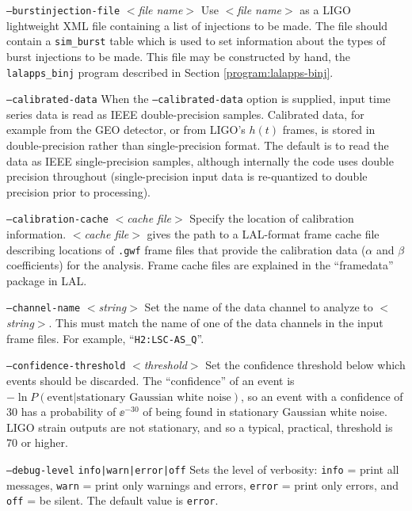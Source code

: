 \documentclass{article}
\newcommand{\option}[1]{\texttt{#1}}
\newcommand{\parm}[1]{$<$\textit{#1}$>$}
\newenvironment{entry}%
  {\begin{list}{}{\renewcommand{\makelabel}[1]%
    {\parbox[b]{\labelwidth}{\makebox[0pt][l]{\textbf{##1}}\\}}%
    \setlength{\labelwidth}{1em}%
    \setlength{\labelsep}{1em}%
    \setlength{\leftmargin}{2em}%
    \setlength{\topsep}{\medskipamount}%
    \setlength{\itemsep}{\medskipamount}%
    \setlength{\parsep}{\medskipamount}%
    \setlength{\listparindent}{0pt}}}
  {\end{list}}
\begin{document}
\begin{entry}
\begin{entry}
\item[\option{--burstinjection-file} \parm{file name}]
Use \parm{file name} as a LIGO lightweight XML file containing a list of
injections to be made.   The file should contain a \verb+sim_burst+ table
which is used to set information about the types of burst injections to be
made.  This file may be constructed by hand, the \verb+lalapps_binj+
program described in Section \ref{program:lalapps-binj}.

\item[\option{--calibrated-data}]
When the \option{--calibrated-data} option is supplied, input time series
data is read as IEEE double-precision samples.  Calibrated data, for
example from the GEO detector, or from LIGO's \(h(t)\) frames, is stored in
double-precision rather than single-precision format.  The default is to
read the data as IEEE single-precision samples, although internally the
code uses double precision throughout (single-precision input data is
re-quantized to double precision prior to processing).

\item[\option{--calibration-cache} \parm{cache file}]
Specify the location of calibration information.  \parm{cache file} gives
the path to a LAL-format frame cache file describing locations of
\texttt{.gwf} frame files that provide the calibration data ($\alpha$ and
$\beta$ coefficients) for the analysis.  Frame cache files are explained in
the ``framedata'' package in LAL.

\item[\option{--channel-name} \parm{string}]
Set the name of the data channel to analyze to \parm{string}.  This must
match the name of one of the data channels in the input frame files.  For
example, ``\verb|H2:LSC-AS_Q|''.

\item[\option{--confidence-threshold} \parm{threshold}]
Set the confidence threshold below which events should be discarded.  The
``confidence'' of an event is \(-\ln P(\text{event} | \text{stationary
Gaussian white noise})\), so an event with a confidence of 30 has a
probability of \(\ee^{-30}\) of being found in stationary Gaussian white
noise.  LIGO strain outputs are not stationary, and so a typical,
practical, threshold is 70 or higher.

\item[\option{--debug-level} \option{info|warn|error|off}]
Sets the level of verbosity:  \option{info} = print all messages,
\option{warn} = print only warnings and errors, \option{error} = print only
errors, and \option{off} = be silent.  The default value is \option{error}.


\end{entry}
\end{entry}
\end{document}
